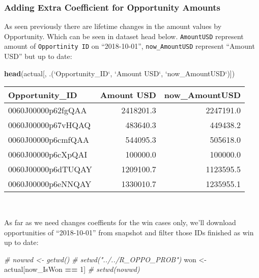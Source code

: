 \documentclass[]{article}
\newenvironment{Shaded}{\begin{snugshade}}{\end{snugshade}}
\newcommand{\CommentTok}[1]{\textcolor[rgb]{0.56,0.35,0.01}{\textit{#1}}}
\newcommand{\DataTypeTok}[1]{\textcolor[rgb]{0.13,0.29,0.53}{#1}}
\newcommand{\DecValTok}[1]{\textcolor[rgb]{0.00,0.00,0.81}{#1}}
\newcommand{\KeywordTok}[1]{\textcolor[rgb]{0.13,0.29,0.53}{\textbf{#1}}}
\newcommand{\NormalTok}[1]{#1}
\newcommand{\OperatorTok}[1]{\textcolor[rgb]{0.81,0.36,0.00}{\textbf{#1}}}
\newcommand{\StringTok}[1]{\textcolor[rgb]{0.31,0.60,0.02}{#1}}
\begin{document}
\newpage

\hypertarget{adding-extra-coefficient-for-opportunity-amounts}{%
\subsubsection{Adding Extra Coefficient for Opportunity
Amounts}\label{adding-extra-coefficient-for-opportunity-amounts}}

As seen previously there are lifetime changes in the amount values by
Opportunity. Which can be seen in dataset head below. \texttt{AmountUSD}
represent amount of \texttt{Opportinity\ ID} on ``2018-10-01'',
\texttt{now\_AmountUSD} represent ``Amount USD'' but up to date:

\begin{Shaded}
\begin{Highlighting}[]
\KeywordTok{head}\NormalTok{(actual[, .(}\StringTok{`}\DataTypeTok{Opportunity_ID}\StringTok{`}\NormalTok{, }\StringTok{`}\DataTypeTok{Amount USD}\StringTok{`}\NormalTok{, }\StringTok{`}\DataTypeTok{now_AmountUSD}\StringTok{`}\NormalTok{)])}
\end{Highlighting}
\end{Shaded}

\begin{tabular}{l|r|r}
\hline
Opportunity\_ID & Amount USD & now\_AmountUSD\\
\hline
0060J00000p62fgQAA & 2418201.3 & 2247191.0\\
\hline
0060J00000p67vHQAQ & 483640.3 & 449438.2\\
\hline
0060J00000p6cmfQAA & 544095.3 & 505618.0\\
\hline
0060J00000p6cXpQAI & 100000.0 & 100000.0\\
\hline
0060J00000p6dTUQAY & 1209100.7 & 1123595.5\\
\hline
0060J00000p6eNNQAY & 1330010.7 & 1235955.1\\
\hline
\end{tabular}

~

As far as we need changes coeffients for the win cases only, we'll
download opportunities of ``2018-10-01'' from snapshot and filter those
IDs finished as win up to date:

\begin{Shaded}
\begin{Highlighting}[]
\CommentTok{# nowwd <- getwd()}
\CommentTok{# setwd("../../R_OPPO_PROB")}
\NormalTok{won <-}\StringTok{ }\NormalTok{actual[now_IsWon }\OperatorTok{==}\StringTok{ }\DecValTok{1}\NormalTok{]}
\CommentTok{# setwd(nowwd)}
\end{Highlighting}
\end{Shaded}
\end{document}
